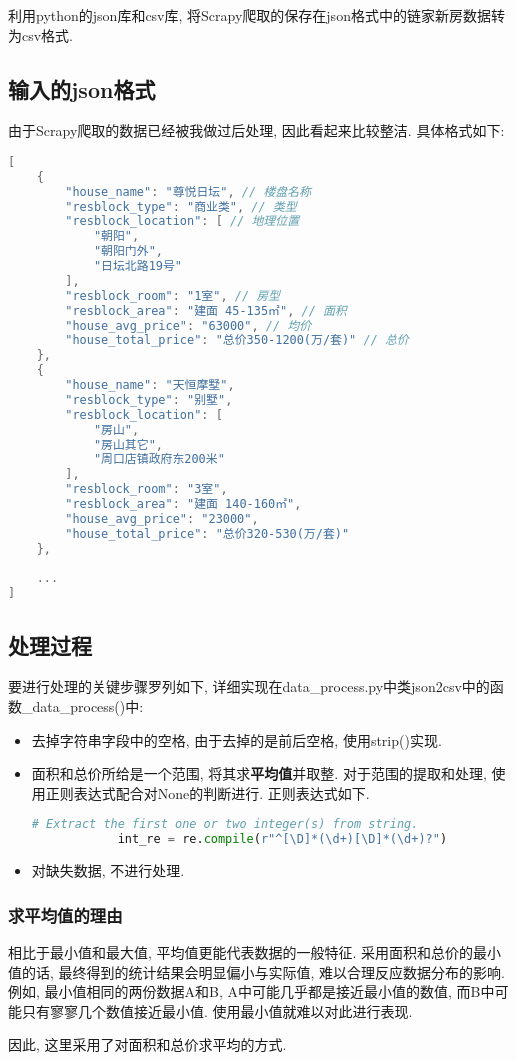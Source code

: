 利用python的json库和csv库,
将Scrapy爬取的保存在json格式中的链家新房数据转为csv格式.\par

\subsection{输入的json格式}
由于Scrapy爬取的数据已经被我做过后处理, 因此看起来比较整洁. 具体格式如下:
\begin{lstlisting}[language=c++]
[
    {
        "house_name": "尊悦日坛", // 楼盘名称
        "resblock_type": "商业类", // 类型
        "resblock_location": [ // 地理位置
            "朝阳",
            "朝阳门外",
            "日坛北路19号"
        ],
        "resblock_room": "1室", // 房型
        "resblock_area": "建面 45-135㎡", // 面积
        "house_avg_price": "63000", // 均价
        "house_total_price": "总价350-1200(万/套)" // 总价
    },
    {
        "house_name": "天恒摩墅",
        "resblock_type": "别墅",
        "resblock_location": [
            "房山",
            "房山其它",
            "周口店镇政府东200米"
        ],
        "resblock_room": "3室",
        "resblock_area": "建面 140-160㎡",
        "house_avg_price": "23000",
        "house_total_price": "总价320-530(万/套)"
    },
    
    ...
]
\end{lstlisting}

\subsection{处理过程}
要进行处理的关键步骤罗列如下,
详细实现在data\_process.py中类json2csv中的函数\_data\_process()中:
\begin{itemize}
    \item 去掉字符串字段中的空格, 由于去掉的是前后空格, 使用strip()实现.
    \item 面积和总价所给是一个范围, 将其求\textbf{平均值}并取整. 对于范围的提取和处理,
        使用正则表达式配合对None的判断进行. 正则表达式如下.
        \begin{lstlisting}[language=python]
            # Extract the first one or two integer(s) from string.
            int_re = re.compile(r"^[\D]*(\d+)[\D]*(\d+)?")
        \end{lstlisting}
    \item 对缺失数据, 不进行处理.
\end{itemize}

\subsubsection{求平均值的理由} %
\label{sec:求平均值的理由}
相比于最小值和最大值, 平均值更能代表数据的一般特征. 采用面积和总价的最小值的话,
最终得到的统计结果会明显偏小与实际值, 难以合理反应数据分布的影响. 例如,
最小值相同的两份数据A和B, A中可能几乎都是接近最小值的数值,
而B中可能只有寥寥几个数值接近最小值. 使用最小值就难以对此进行表现.\par
因此, 这里采用了对面积和总价求平均的方式.

